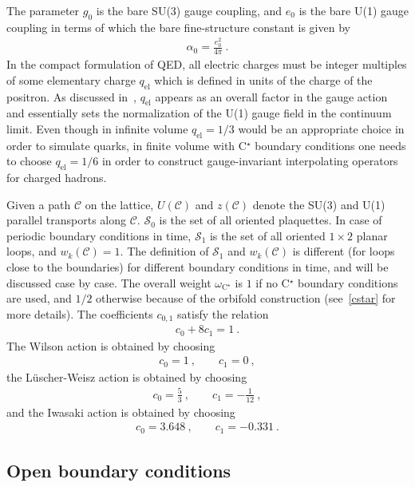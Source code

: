 \documentclass[11pt,fleqn]{article}
\begin{document}
The parameter $g_0$ is the bare SU(3) gauge coupling, and $e_0$ is the bare U(1) gauge coupling in terms of which the bare fine-structure constant is given by
\begin{gather}
   \alpha_0 = \frac{e_0^2}{4\pi} \ .
\end{gather}
In the compact formulation of QED, all electric charges must be integer multiples of some elementary charge $q_\text{el}$ which is defined in units of the charge of the positron. As discussed in~\cite{Lucini:2015hfa}, $q_\text{el}$ appears as an overall factor in the gauge action and essentially sets the normalization of the U(1) gauge field in the continuum limit. Even though in infinite volume $q_\text{el}=1/3$ would be an appropriate choice in order to simulate quarks, in finite volume with C$^\star$ boundary conditions one needs to choose $q_\text{el}=1/6$ in order to construct gauge-invariant interpolating operators for charged hadrons.

Given a path $\mathcal{C}$ on the lattice, $U(\mathcal{C})$ and $z(\mathcal{C})$ denote the SU(3) and U(1) parallel transports along $\mathcal{C}$. $\mathcal{S}_0$ is the set of all oriented plaquettes. In case of periodic boundary conditions in time, $\mathcal{S}_1$ is the set of all oriented $1 \times 2$ planar loops, and $w_k(\mathcal{C})=1$.
The definition of $\mathcal{S}_1$ and $w_k(\mathcal{C})$ is different (for loops close to the boundaries) for different boundary conditions in time, and will be discussed case by case.
The overall weight $\omega_{\text{C}^\star}$ is $1$ if no C$^\star$ boundary conditions are used, and $1/2$ otherwise because of the orbifold construction (see~\ref{cstar} for more details).
The coefficients $c_{0,1}$ satisfy the relation
\begin{gather}
   c_0 + 8c_1 = 1 \ .
\end{gather}
The Wilson action is obtained by choosing
\begin{gather}
   c_0 = 1 \ , \qquad c_1 = 0 \ ,
\end{gather}
the L\"uscher-Weisz action is obtained by choosing
\begin{gather}
   c_0 = \tfrac{5}{3} \ , \qquad c_1 = -\tfrac{1}{12} \ ,
\end{gather}
and the Iwasaki action is obtained by choosing
\begin{gather}
   c_0 = 3.648 \ , \qquad c_1 = -0.331 \ .
\end{gather}

\subsection{Open boundary conditions}
\end{document}
